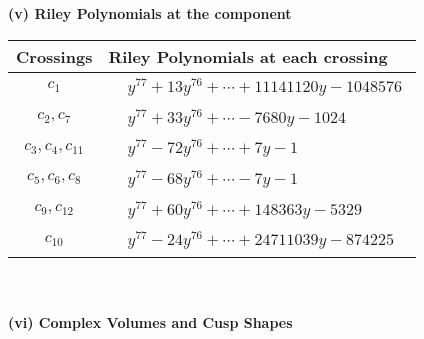 \documentclass[1p]{elsarticle_modified}
\theoremstyle{definition}
\begin{document}
\newpage\renewcommand{\arraystretch}{1}
\flushleft \textbf{(v) Riley Polynomials at the component}\newline \\
\begin{tabular}{m{50pt}|m{274pt}}
Crossings & \hspace{64pt}Riley Polynomials at each crossing \\
\hline $$\begin{aligned}c_{1}\end{aligned}$$&$\begin{aligned}
&y^{77}+13 y^{76}+\cdots+11141120 y-1048576
\end{aligned}$\\
\hline $$\begin{aligned}c_{2},c_{7}\end{aligned}$$&$\begin{aligned}
&y^{77}+33 y^{76}+\cdots-7680 y-1024
\end{aligned}$\\
\hline $$\begin{aligned}c_{3},c_{4},c_{11}\end{aligned}$$&$\begin{aligned}
&y^{77}-72 y^{76}+\cdots+7 y-1
\end{aligned}$\\
\hline $$\begin{aligned}c_{5},c_{6},c_{8}\end{aligned}$$&$\begin{aligned}
&y^{77}-68 y^{76}+\cdots-7 y-1
\end{aligned}$\\
\hline $$\begin{aligned}c_{9},c_{12}\end{aligned}$$&$\begin{aligned}
&y^{77}+60 y^{76}+\cdots+148363 y-5329
\end{aligned}$\\
\hline $$\begin{aligned}c_{10}\end{aligned}$$&$\begin{aligned}
&y^{77}-24 y^{76}+\cdots+24711039 y-874225
\end{aligned}$\\
\hline
\end{tabular}\\~\\
\newpage\flushleft \textbf{(vi) Complex Volumes and Cusp Shapes}
\end{document}
